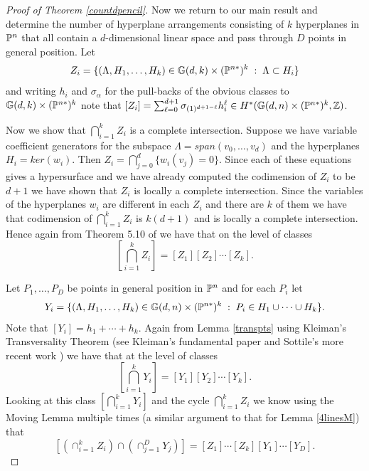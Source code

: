 \documentclass[12pt]{article}
\theoremstyle{plain}
\theoremstyle{definition}
\newcommand{\Z}{\mathbb{Z}}
\newcommand{\G}{\mathbb{G}}
\renewcommand{\P}{\ensuremath \mathbb{P}}
\begin{document}
\begin{proof}[Proof of Theorem \ref{countdpencil}]

Now we return to our main result and determine the number of
hyperplane arrangements consisting of $k$ hyperplanes in $\P^n$ that
all contain a $d$-dimensional linear space and pass through $D$ points
in general position. Let $$ Z_i = \{(\Lambda, H_1, \ldots, H_k) \in
\G(d,k) \times (\P^{n*})^k \; : \; \Lambda \subset H_i \} $$ and
writing $h_i$ and $\sigma_\alpha$ for the pull-backs of the obvious
classes to $\G(d,k) \times (\P^{n*})^k$ note that $[Z_i]
=\sum_{\ell=0}^{d+1} \sigma_{(1)^{d+1-\ell}} h_i^{\ell} \in H^*( \G(d,n) \times
(\P^{n*})^k,\Z)$. 

Now we show that $\bigcap_{i=1}^kZ_i$ is a complete intersection. Suppose we have variable coefficient generators for the subspace $\Lambda=span( v_0,\dots ,v_d)$ and the hyperplanes $H_i=ker (w_i)$. Then $Z_i=\bigcap_{j=0}^d\{ w_i(v_j)=0\}$. Since each of these equations gives a hypersurface and we have already computed the codimension of $Z_i$ to be $d+1$ we have shown that $Z_i$ is locally a complete intersection. Since the variables of the hyperplanes $w_i$ are different in each $Z_i$ and there are $k$ of them we have that codimension of $\bigcap_{i=1}^kZ_i$ is $k(d+1)$ and is locally a complete intersection. Hence again from Theorem 5.10 of \cite{EH} we have that on the level of classes $$\left[ \bigcap_{i=1}^kZ_i\right] =[Z_1][Z_2]\cdots [Z_k].$$

Let $P_1,\ldots, P_D$ be points in general position in $\P^n$ and for
each $P_i$ let $$ Y_i = \{(\Lambda, H_1,\ldots, H_k)
\in \G(d,n) \times (\P^{n*})^k \; : \; P_i \in H_1 \cup \cdots \cup H_k \}. $$ Note that $[Y_i] =
h_1+\cdots+h_k.$ Again from Lemma \ref{transpts} using Kleiman's Transversality Theorem (see Kleiman's fundamental paper \cite{Kleiman} and
Sottile's more recent work \cite{Sottile}) we have that at the level of classes $$\left[ \bigcap_{i=1}^kY_i\right] =[Y_1][Y_2]\cdots [Y_k].$$ Looking at this class $\left[ \bigcap_{i=1}^kY_i\right]$ and the cycle $\bigcap_{i=1}^kZ_i$ we know using the Moving Lemma multiple times (a similar argument to that for Lemma \ref{4linesM}) that $$\left[\left( \cap_{i=1}^k Z_i \right) \cap \left( \cap_{j=1}^{D} Y_j
\right) \right]= [Z_1] \cdots [Z_k] [Y_1] \cdots [Y_D] .$$


\end{proof}
\end{document}
